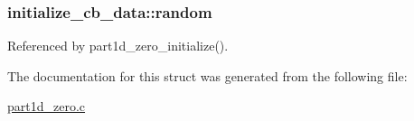 \subsubsection[{\texorpdfstring{random}{random}}]{ initialize\+\_\+cb\+\_\+data\+::random}\hypertarget{structinitialize__cb__data_a3007992befe57b32b4b6de053f10ac68}{}\label{structinitialize__cb__data_a3007992befe57b32b4b6de053f10ac68}


Referenced by part1d\+\_\+zero\+\_\+initialize().



The documentation for this struct was generated from the following file\+:\begin{DoxyCompactItemize}
\item 
\hyperlink{part1d__zero_8c}{part1d\+\_\+zero.\+c}\end{DoxyCompactItemize}
